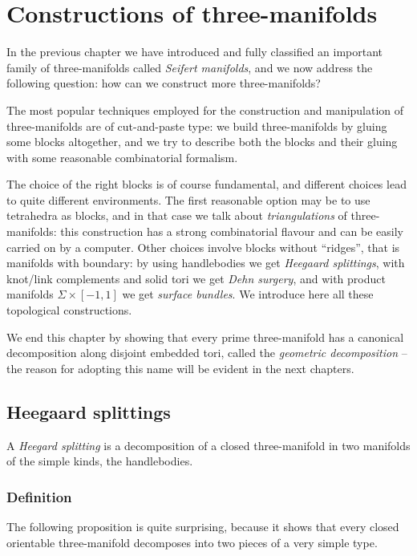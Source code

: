\chapter{Constructions of three-manifolds} \label{construction:chapter}

In the previous chapter we have introduced and fully classified an important family of three-manifolds called \emph{Seifert manifolds}, and we now address the following question: how can we construct more three-manifolds?

The most popular techniques employed for the construction and manipulation of three-manifolds are of cut-and-paste type: we build three-manifolds by gluing some blocks altogether, and we try to describe both the blocks and their gluing with some reasonable combinatorial formalism.

The choice of the right blocks is of course fundamental, and different choices lead to quite different environments.
The first reasonable option may be to use tetrahedra as blocks, and in that case we talk about \emph{triangulations} of three-manifolds: this construction has a strong combinatorial flavour and can be easily carried on by a computer. Other choices involve blocks without ``ridges'', that is manifolds with boundary: by using handlebodies we get \emph{Heegaard splittings}, with knot/link complements and solid tori we get \emph{Dehn surgery}, and with product manifolds $\Sigma \times [-1,1]$ we get \emph{surface bundles}. We introduce here all these topological constructions.

We end this chapter by showing that every prime three-manifold has a canonical decomposition along disjoint embedded tori, called the \emph{geometric decomposition} -- the reason for adopting this name will be evident in the next chapters.

\section{Heegaard splittings}
A \emph{Heegard splitting} is a decomposition of a closed three-manifold in two manifolds of the simple kinds, the handlebodies. 

\subsection{Definition}
The following proposition is quite surprising, because it shows that every closed orientable three-manifold decomposes into two pieces of a very simple type. 

